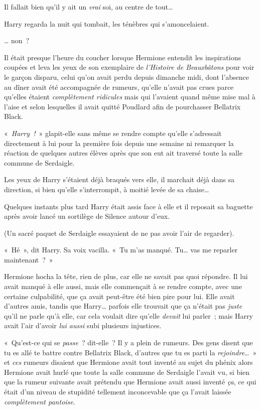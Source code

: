 Il fallait bien qu'il y ait un \emph{vrai} soi, au centre de tout…

Harry regarda la nuit qui tombait, les ténèbres qui s'amoncelaient.

… non~?

\later

Il était presque l'heure du coucher lorsque Hermione entendit les inspirations coupées et leva les yeux de son exemplaire de \emph{l'Histoire de Beauxbâtons} pour voir le garçon disparu, celui qu'on avait perdu depuis dimanche midi, dont l'absence au dîner avait été accompagnée de rumeurs, qu'elle n'avait pas crues parce qu'elles étaient \emph{complètement ridicules} mais qui l'avaient quand même mise mal à l'aise et selon lesquelles il avait quitté Poudlard afin de pourchasser Bellatrix Black.

«~\emph{Harry~!}~» glapit-elle sans même se rendre compte qu'elle s'adressait directement à lui pour la première fois depuis une semaine ni remarquer la réaction de quelques autres élèves après que son eut ait traversé toute la salle commune de Serdaigle.

Les yeux de Harry s'étaient déjà braqués vers elle, il marchait déjà dans sa direction, si bien qu'elle s'interrompit, à moitié levée de sa chaise…

Quelques instants plus tard Harry était assis face à elle et il reposait sa baguette après avoir lancé un sortilège de Silence autour d'eux.

(Un sacré paquet de Serdaigle essayaient de ne pas avoir l'air de regarder).

«~Hé~», dit Harry. Sa voix vacilla. «~Tu m'as manqué. Tu… vas me reparler maintenant~?~»

Hermione hocha la tête, rien de plus, car elle ne savait pas quoi répondre. Il lui avait manqué à elle aussi, mais elle commençait à se rendre compte, avec une certaine culpabilité, que ça avait peut-être été bien pire pour lui. Elle avait d'autres amis, tandis que Harry… parfois elle trouvait que ça n'était pas \emph{juste} qu'il ne parle qu'à elle, car cela voulait dire qu'elle \emph{devait} lui parler~; mais Harry avait l'air d'avoir \emph{lui aussi} subi plusieurs injustices.

«~Qu'est-ce qui se \emph{passe}~? dit-elle~? Il y a plein de rumeurs. Des gens disent que tu es allé te battre contre Bellatrix Black, d'autres que tu es parti la \emph{rejoindre}…~» et \emph{ces} rumeurs disaient que Hermione avait tout inventé au sujet du phénix alors Hermione avait hurlé que toute la salle commune de Serdaigle l'avait vu, si bien que la rumeur suivante avait prétendu que Hermione avait aussi inventé \emph{ça}, ce qui était d'un niveau de stupidité tellement inconcevable que ça l'avait laissée \emph{complètement pantoise}.

